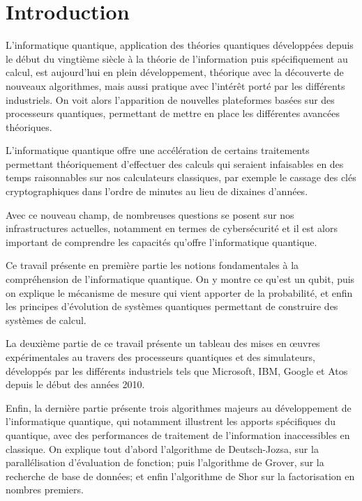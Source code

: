 \chapter{Introduction}

L'informatique quantique, application des théories quantiques développées depuis le début du vingtième siècle à la théorie de l'information puis spécifiquement au calcul, est aujourd'hui en plein développement, théorique avec la découverte de nouveaux algorithmes, mais aussi pratique avec l'intérêt porté par les différents industriels. On voit alors l'apparition de nouvelles plateformes basées sur des processeurs quantiques, permettant de mettre en place les différentes avancées théoriques.

L'informatique quantique offre une accélération de certains traitements permettant théoriquement d'effectuer des calculs qui seraient infaisables en des temps raisonnables sur nos calculateurs classiques, par exemple le cassage des clés cryptographiques dans l'ordre de minutes au lieu de dixaines d'années.

Avec ce nouveau champ, de nombreuses questions se posent sur nos infrastructures actuelles, notamment en termes de cybersécurité et il est alors important de comprendre les capacités qu'offre l'informatique quantique.

Ce travail présente en première partie les notions fondamentales à la compréhension de l'informatique quantique. On y montre ce qu'est un qubit, puis on explique le mécanisme de mesure qui vient apporter de la probabilité, et enfin les principes d'évolution de systèmes quantiques permettant de construire des systèmes de calcul.

La deuxième partie de ce travail présente un tableau des mises en \oe{}uvres expérimentales au travers des processeurs quantiques et des simulateurs, développés par les différents industriels tels que Microsoft, IBM, Google et Atos depuis le début des années 2010.

Enfin, la dernière partie présente trois algorithmes majeurs au développement de l'informatique quantique, qui notamment illustrent les apports spécifiques du quantique, avec des performances de traitement de l'information inaccessibles en classique. On explique tout d'abord l'algorithme de Deutsch-Jozsa, sur la parallélisation d'évaluation de fonction; puis l'algorithme de Grover, sur la recherche de base de données; et enfin l'algorithme de Shor sur la factorisation en nombres premiers.